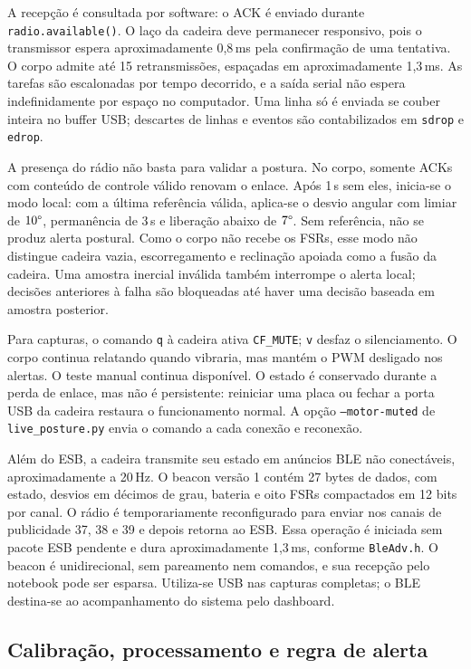 A recepção é consultada por software: o ACK é enviado durante
\texttt{radio.available()}. O laço da cadeira deve permanecer
responsivo, pois o transmissor espera aproximadamente 0{,}8\,ms
pela confirmação de uma tentativa. O corpo admite até 15
retransmissões, espaçadas em aproximadamente 1{,}3\,ms. As tarefas
são escalonadas por tempo decorrido, e a saída serial não espera
indefinidamente por espaço no computador. Uma linha só é enviada se
couber inteira no buffer USB; descartes de linhas e eventos são
contabilizados em \texttt{sdrop} e \texttt{edrop}.

A presença do rádio não basta para validar a postura. No corpo,
somente ACKs com conteúdo de controle válido renovam o enlace. Após
1\,s sem eles, inicia-se o modo local: com a última referência válida,
aplica-se o desvio angular com limiar de $10\degree{}$, permanência de
3\,s e liberação abaixo de $7\degree{}$. Sem referência, não se
produz alerta postural. Como o corpo não recebe os FSRs, esse modo não
distingue cadeira vazia, escorregamento e reclinação apoiada como a
fusão da cadeira. Uma amostra inercial inválida também interrompe o
alerta local; decisões anteriores à falha são bloqueadas até haver
uma decisão baseada em amostra posterior.

Para capturas, o comando \texttt{q} à cadeira ativa
\texttt{CF\_MUTE}; \texttt{v} desfaz o silenciamento. O corpo continua
relatando quando vibraria, mas mantém o PWM desligado nos alertas. O
teste manual continua disponível. O estado é conservado durante a
perda de enlace, mas não é persistente: reiniciar uma placa ou fechar
a porta USB da cadeira restaura o funcionamento normal. A opção
\texttt{--motor-muted} de \texttt{live\_posture.py} envia o comando
a cada conexão e reconexão.

Além do ESB, a cadeira transmite seu estado em anúncios BLE não
conectáveis, aproximadamente a 20\,Hz. O beacon versão 1 contém
27 bytes de dados, com estado, desvios em décimos de grau, bateria e
oito FSRs compactados em 12 bits por canal. O rádio é temporariamente
reconfigurado para enviar nos canais de publicidade 37, 38 e 39 e
depois retorna ao ESB. Essa operação é iniciada sem pacote ESB pendente
e dura aproximadamente 1{,}3\,ms, conforme \texttt{BleAdv.h}.
O beacon é unidirecional, sem pareamento nem comandos, e sua recepção
pelo notebook pode ser esparsa. Utiliza-se USB nas capturas completas;
o BLE destina-se ao acompanhamento do sistema pelo dashboard.

\subsection{Calibração, processamento e regra de alerta}
\label{sec:met-regra}


